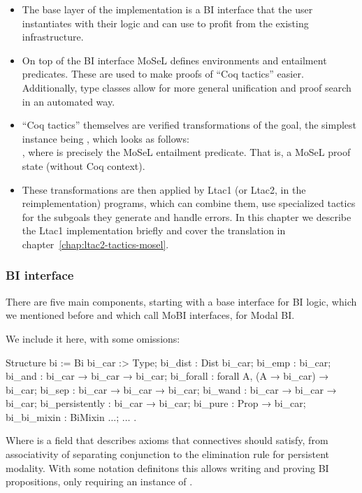 \begin{itemize}
\item The base layer of the implementation is a BI interface that the user instantiates with their logic and can use to profit from the existing infrastructure.
\item On top of the BI interface MoSeL defines environments and entailment predicates. These are used to make proofs of ``Coq tactics'' easier.
  Additionally, type classes allow for more general unification and proof search in an automated way.
\item ``Coq tactics'' themselves are verified transformations of the goal, the simplest instance being , which looks as follows:\\
  , 
  where  is precisely the MoSeL entailment predicate.
  That is, a MoSeL proof state (without Coq context).
\item These transformations are then applied by Ltac1 (or Ltac2, in the reimplementation) programs, which can combine them, use specialized tactics for the subgoals they generate and handle errors.
  In this chapter we describe the Ltac1 implementation briefly and cover the translation in chapter~\ref{chap:ltac2-tactics-mosel}.
\end{itemize}

\subsubsection{BI interface}
\label{subsubsec:bi-interface}

There are five main components, starting with a base interface for BI logic, which we mentioned before and which \citet{krebbersMoSeLGeneralExtensible2018} call MoBI interfaces, for Modal BI.

We include it here, with some omissions:
\begin{coq}
Structure bi := Bi {
  bi_car :> Type;
  bi_dist : Dist bi_car;
  bi_emp : bi_car;
  bi_and : bi_car → bi_car → bi_car;
  bi_forall : forall A, (A → bi_car) → bi_car;
  bi_sep : bi_car → bi_car → bi_car;
  bi_wand : bi_car → bi_car → bi_car;
  bi_persistently : bi_car → bi_car;
  bi_pure : Prop → bi_car;
  bi_bi_mixin : BiMixin $\ldots$;
  $\ldots$
}.
\end{coq}

Where  is a field that describes axioms that connectives should satisfy, from associativity of separating conjunction to the elimination rule for persistent modality.
With some notation definitons this allows writing and proving BI propositions, only requiring an instance of .

